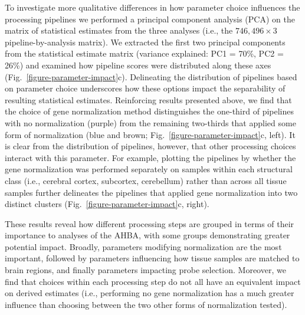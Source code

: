 \documentclass[12pt,aps,pra,reprint,showkeys]{revtex4-1}
\begin{document}
To investigate more qualitative differences in how parameter choice influences the processing pipelines we performed a principal component analysis (PCA) on the matrix of statistical estimates from the three analyses (i.e., the $746,496 \times 3$ pipeline-by-analysis matrix).
We extracted the first two principal components from the statistical estimate matrix (variance explained: PC1 = 70\%, PC2 = 26\%) and examined how pipeline scores were distributed along these axes (Fig.~\ref{figure-parameter-impact}c).
Delineating the distribution of pipelines based on parameter choice underscores how these options impact the separability of resulting statistical estimates.
Reinforcing results presented above, we find that the choice of gene normalization method distinguishes the one-third of pipelines with no normalization (purple) from the remaining two-thirds that applied some form of normalization (blue and brown; Fig.~\ref{figure-parameter-impact}c, left).
It is clear from the distribution of pipelines, however, that other processing choices interact with this parameter.
For example, plotting the pipelines by whether the gene normalization was performed separately on samples within each structural class (i.e., cerebral cortex, subcortex, cerebellum) rather than across all tissue samples further delineates the pipelines that applied gene normalization into two distinct clusters (Fig.~\ref{figure-parameter-impact}c, right).

These results reveal how different processing steps are grouped in terms of their importance to analyses of the AHBA, with some groups demonstrating greater potential impact.
Broadly, parameters modifying normalization are the most important, followed by parameters influencing how tissue samples are matched to brain regions, and finally parameters impacting probe selection.
Moreover, we find that choices within each processing step do not all have an equivalent impact on derived estimates (i.e., performing no gene normalization has a much greater influence than choosing between the two other forms of normalization tested).
\end{document}
